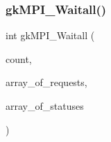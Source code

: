 \mbox{\label{a00359_a8fb70b0ee91eb5e31adfdf681c67c31f}} 
\subsubsection{\texorpdfstring{gk\+M\+P\+I\+\_\+\+Waitall()}{gkMPI\_Waitall()}}
{\footnotesize\ttfamily int gk\+M\+P\+I\+\_\+\+Waitall (\begin{DoxyParamCaption}\item[{\hyperlink{a00876_aaa5262be3e700770163401acb0150f52}{idx\+\_\+t}}]{count,  }\item[{M\+P\+I\+\_\+\+Request $\ast$}]{array\+\_\+of\+\_\+requests,  }\item[{M\+P\+I\+\_\+\+Status $\ast$}]{array\+\_\+of\+\_\+statuses }\end{DoxyParamCaption})}

